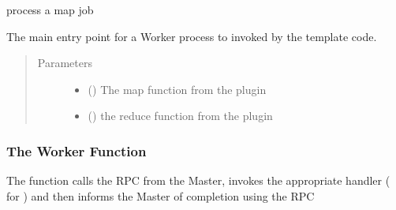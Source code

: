 \documentclass[letterpaper,10pt,english]{sphinxmanual}
\begin{document}

\begin{fulllineitems}
\label{\detokenize{labs/lab2:Map}}
process a map job

\end{fulllineitems}


\begin{fulllineitems}
\label{\detokenize{labs/lab2:Worker}}
The main entry point for a
Worker process to invoked by the template code.
\begin{quote}\begin{description}
\item[{Parameters}] \leavevmode\begin{itemize}
\item {} 
 () \textendash{} The map function from the plugin

\item {} 
 () \textendash{} the reduce function from the plugin

\end{itemize}

\end{description}\end{quote}

\end{fulllineitems}



\subsubsection{The Worker Function}
\label{\detokenize{labs/lab2:the-worker-function}}
The {\hyperref[\detokenize{labs/lab2:Worker}]{}} function calls the 
RPC from the Master, invokes the appropriate handler
({\hyperref[\detokenize{labs/lab2:Map}]{}} for {\hyperref[\detokenize{labs/lab2:Reduce}]{}}) and then informs the
Master of completion using the 
RPC
\end{document}

